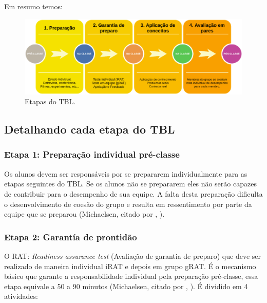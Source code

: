 Em resumo temos:

\begin{figure}[h!]
	\centering
  \includegraphics[keepaspectratio=true,scale=0.5]{figuras/tbl2.eps}
  \caption{Etapas do TBL.}
	\label{fig:tbl2}
\end{figure}

\subsection{Detalhando cada etapa do TBL}

\subsubsection{Etapa 1: Preparação individual pré-classe}

Os alunos devem ser responsáveis por se prepararem individualmente para as etapas seguintes do TBL. Se os alunos não se prepararem eles não serão capazes de contribuir para o desempenho de sua equipe. A falta desta preparação dificulta o desenvolvimento de coesão do grupo e resulta em ressentimento por parte da equipe que se preparou (Michaelsen, citado por \citeauthor{bollela}, \citeyear{bollela}).

\subsubsection{Etapa 2: Garantía de prontidão}

O RAT: \textit{Readiness assurance test} (Avaliação de garantia de preparo) que deve ser realizado de maneira individual iRAT e depois em grupo gRAT. É o mecanismo básico que garante a responsabilidade individual pela preparação pré-classe, essa etapa equivale a 50 a 90 minutos (Michaelsen, citado por \citeauthor{bollela}, \citeyear{bollela}). É dividido em 4 atividades:

